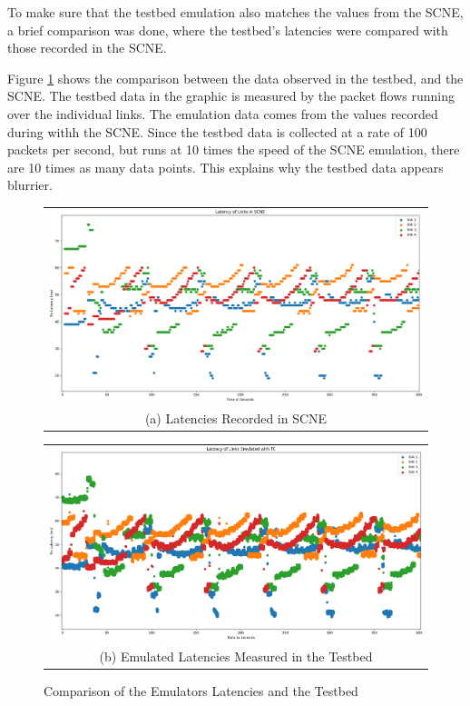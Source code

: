To make sure that the testbed emulation also matches the values from the SCNE, a brief comparison was done, where the testbed's latencies were compared with those recorded in the SCNE. 

Figure \ref{fig:sim_vs_em} shows the comparison between the data observed in the testbed, and the SCNE. The testbed data in the graphic is measured by the packet flows running over the individual links. The emulation data comes from the values recorded during withh the SCNE. Since the testbed data is collected at a rate of 100 packets per second, but runs at 10 times the speed of the SCNE emulation, there are 10 times as many data points. This explains why the testbed data appears blurrier.

\begin{figure}
  \centering
  \begin{tabular}{@{}c@{}}
    \includegraphics[width=\linewidth]{fig/simulated_latencies.png} \\[\abovecaptionskip]
    \small (a) Latencies Recorded in SCNE
  \end{tabular}

  \vspace{\floatsep}

  \begin{tabular}{@{}c@{}}
    \includegraphics[width=\linewidth]{fig/emulated_latencies.png} \\[\abovecaptionskip]
    \small (b) Emulated Latencies Measured in the Testbed
  \end{tabular}

  \caption{Comparison of the Emulators Latencies and the Testbed}\label{fig:sim_vs_em}
\end{figure}

